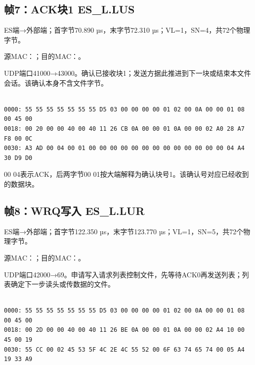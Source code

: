 \subsection*{帧7：ACK块1 ES\_L.LUS}

ES端→外部端；首字节70.890 µs，末字节72.310 µs；VL=1，SN=4，共72个物理字节。

源MAC：；目的MAC：。

UDP端口41000→43000。确认已接收块1；发送方据此推进到下一块或结束本文件会话。该确认本身不含文件字节。

\par\noindent\begin{minipage}{\linewidth}
\begin{lstlisting}[caption={帧7物理字节，偏移0000--0047}]

0000: 55 55 55 55 55 55 55 D5 03 00 00 00 00 01 02 00 0A 00 00 01 08 00 45 00
0018: 00 20 00 00 40 00 40 11 26 CB 0A 00 00 01 0A 00 00 02 A0 28 A7 F8 00 0C
0030: A3 AD 00 04 00 01 00 00 00 00 00 00 00 00 00 00 00 00 00 04 A4 30 D9 D0

\end{lstlisting}
\end{minipage}\par

00 04表示ACK，后两字节00 01按大端解释为确认块号1。该确认号对应已经收到的数据块。

\subsection*{帧8：WRQ写入 ES\_L.LUR}

ES端→外部端；首字节122.350 µs，末字节123.770 µs；VL=1，SN=5，共72个物理字节。

源MAC：；目的MAC：。

UDP端口42000→69。申请写入请求列表控制文件，先等待ACK0再发送列表；列表确定下一步读头或传数据的文件。

\par\noindent\begin{minipage}{\linewidth}
\begin{lstlisting}[caption={帧8物理字节，偏移0000--0047}]

0000: 55 55 55 55 55 55 55 D5 03 00 00 00 00 01 02 00 0A 00 00 01 08 00 45 00
0018: 00 2D 00 00 40 00 40 11 26 BE 0A 00 00 01 0A 00 00 02 A4 10 00 45 00 19
0030: 55 CC 00 02 45 53 5F 4C 2E 4C 55 52 00 6F 63 74 65 74 00 05 A4 19 33 A9

\end{lstlisting}
\end{minipage}\par

